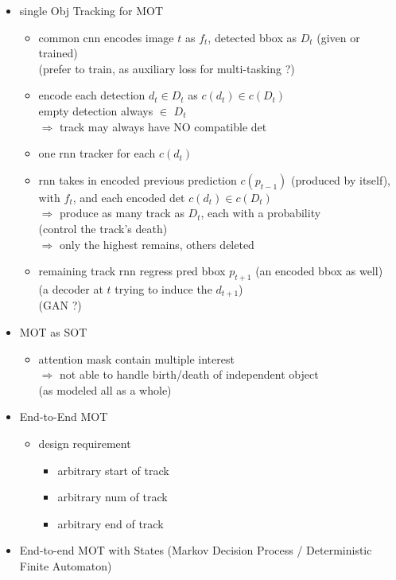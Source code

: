 \begin{itemize}
\begin{itemize}
	\item single Obj Tracking for MOT
		\begin{itemize}
		\item common cnn encodes image $t$ as $f_t$, detected bbox as $D_t$ (given or trained) \\
		(prefer to train, as auxiliary loss for multi-tasking ?)
		\item encode each detection $d_t \in D_t$ as $c(d_t) \in c(D_t)$ \\
		empty detection always $\in$ $D_t$ \\
		$\Rightarrow$ track may always have NO compatible det
		\item one rnn tracker for each $c(d_t)$
		\item rnn takes in encoded previous prediction $c(p_{t-1})$ (produced by itself), with $f_t$, and each encoded det $c(d_t) \in c(D_t)$ \\
		$\Rightarrow$ produce as many track as $D_t$, each with a probability \\ 
		(control the track's death) \\
		$\Rightarrow$ only the highest remains, others deleted
		\item remaining track rnn regress pred bbox $p_{t+1}$ (an encoded bbox as well) \\
		(a decoder at $t$ trying to induce the $d_{t+1}$) \\
		(GAN ?)
		\end{itemize}
	\item MOT as SOT
		\begin{itemize}
		\item attention mask contain multiple interest \\
		$\Rightarrow$ not able to handle birth/death of independent object \\
		(as modeled all as a whole)
		\end{itemize}
	\item End-to-End MOT
		\begin{itemize}
		\item design requirement
			\begin{itemize}
			\item arbitrary start of track
			\item arbitrary num of track
			\item arbitrary end of track
			\end{itemize}
		\end{itemize}
	\item End-to-end MOT with States (Markov Decision Process / Deterministic Finite Automaton)

\end{itemize}
\end{itemize}
